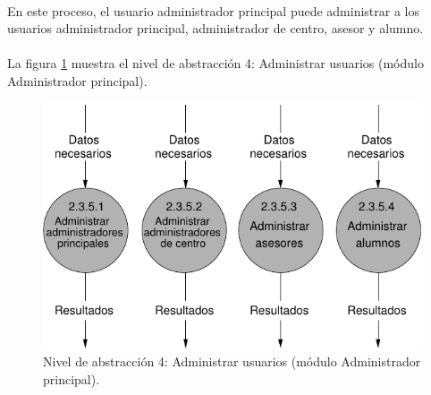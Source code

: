 \paragraph{}En este proceso, el usuario administrador principal puede
administrar a los usuarios administrador principal, administrador de centro,
asesor y alumno.

\paragraph{}La figura \ref{diagramaNivel4-AdministrarUsuarios}
muestra el nivel de abstracción 4: Administrar usuarios (módulo Administrador
principal).

  \begin{figure}[!ht]
    \begin{center}
      \includegraphics[]{08.Analisis_Funcional/8.2.DFDs/Niveles/Nivel4/AdministradorPrincipal/AdministrarUsuarios/Diagramas/nivel4-AdministrarUsuarios.pdf}
      \caption{Nivel de abstracción 4: Administrar usuarios (módulo Administrador
principal).}
      \label{diagramaNivel4-AdministrarUsuarios}
    \end{center}
  \end{figure}
